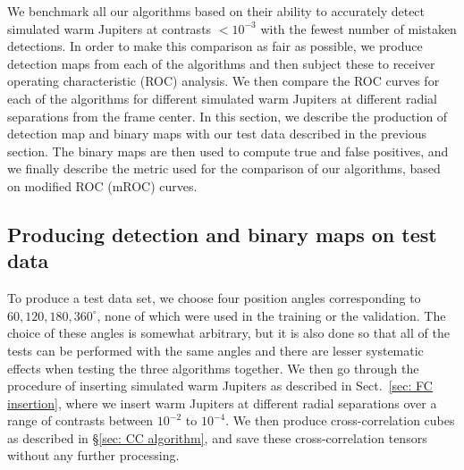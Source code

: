 \documentclass{aa}
\begin{document}
We benchmark all our algorithms based on their ability to accurately detect simulated warm Jupiters at contrasts $<10^{-3}$ with the fewest number of mistaken detections.
In order to make this comparison as fair as possible, we produce detection maps from each of the algorithms and then subject these to receiver operating characteristic (ROC) analysis.
We then compare the ROC curves for each of the algorithms for different simulated warm Jupiters at different radial separations from the frame center.
In this section, we describe the production of detection map and binary maps with our test data described in the previous section.
The binary maps are then used to compute true and false positives, and we finally describe the metric used for the comparison of our algorithms, based on modified ROC (mROC) curves.


\subsection{Producing detection and binary maps on test data}\label{sec:testdata}

To produce a test data set, we choose four position angles corresponding to $60,120,180,360^{\circ}$, none of which were used in the training or the validation.
The choice of these angles is somewhat arbitrary, but it is also done so that all of the tests can be performed with the same angles and there are lesser systematic effects when testing the three algorithms together.
We then go through the procedure of inserting simulated warm Jupiters as described in Sect.~\ref{sec: FC insertion}, where we insert warm Jupiters at different radial separations over a range of contrasts between $10^{-2}$ to $10^{-4}$. We then produce cross-correlation cubes as described in \S\ref{sec: CC algorithm}, and save these cross-correlation tensors without any further processing.
\end{document}
